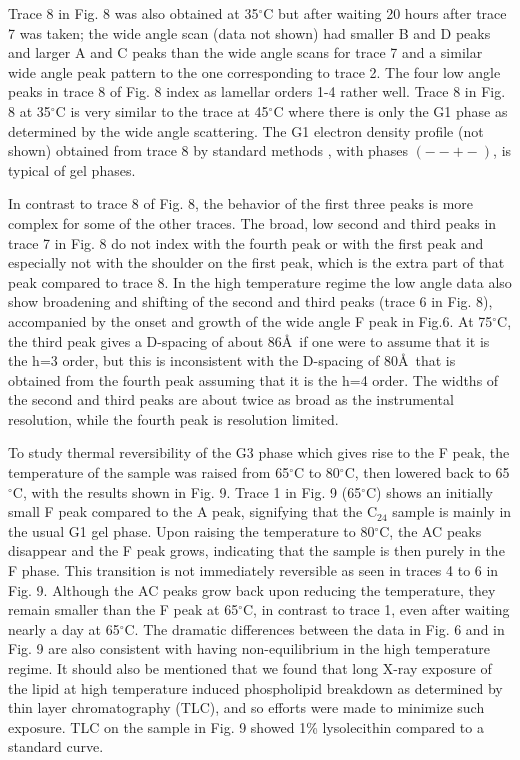 Trace 8 in Fig. 8 was also obtained at 35$^{\circ}$C but after waiting 20 hours 
after trace 7 was taken; the wide angle scan (data not shown) had smaller B 
and D peaks and larger A and C peaks than the wide angle scans for trace 7 and
a similar wide angle peak pattern to the one corresponding to trace 2.
The four low angle peaks in trace 8 of Fig. 8 index as lamellar orders 1-4 
rather well.  Trace 8 in Fig. 8 at 35$^{\circ}$C is very similar to the trace 
at 45$^{\circ}$C 
where there is only the G1 phase as determined by the wide angle scattering.
The G1 electron density profile (not shown) obtained from trace 8 by standard 
methods \cite{McI89}, with phases $(--+-)$, is typical of gel phases.

In contrast to trace 8 of Fig. 8, the behavior of the first three peaks
is more complex for some of the other traces.
The broad, low second and third peaks in trace 7 in Fig. 8 
do not index with the fourth peak or with the first peak and especially
not with the shoulder on the first peak, which is the extra part of that
peak compared to trace 8.  In the high temperature regime the low angle data 
also show broadening and shifting of the second and third peaks
(trace 6 in Fig. 8), accompanied by the onset and growth of the wide angle F 
peak in
Fig.6.  At 75$^{\circ}$C, the third peak gives a D-spacing of about 86\AA\ 
if one were to assume that it is the h=3 order, but this is inconsistent with
the D-spacing of 80\AA\ that is obtained from the fourth peak assuming that it 
is the h=4 order.  The widths of the second and third peaks are about twice as
broad as the instrumental resolution, while the fourth peak is resolution 
limited. 

To study thermal reversibility of the G3 phase which gives
rise to the F peak, the temperature of the sample was raised from 
65$^{\circ}$C to 80$^{\circ}$C, then lowered back to 65$^{\circ}$C, with 
the results shown in Fig. 9.   Trace 1 in Fig. 9 (65$^{\circ}$C) shows an 
initially
small F peak compared to the A peak, signifying that the C$_{24}$ sample is 
mainly in the usual G1 gel phase. Upon raising the temperature to 80$^{\circ}$C,
the AC peaks disappear and the F peak grows, indicating that the sample is 
then purely in the F phase. This transition is not immediately reversible as 
seen in traces 4 to 6 in Fig. 9.  Although the AC peaks grow back upon 
reducing the temperature, they remain smaller than the F peak at 65$^{\circ}$C,
in contrast to trace 1, even after waiting nearly a day at 65$^{\circ}$C.
The dramatic differences between the data in Fig. 6 and in Fig. 9 are also
consistent with having non-equilibrium in the high temperature regime.
It should also be mentioned that we found that long X-ray exposure of the
lipid at high temperature induced phospholipid breakdown as determined by 
thin layer chromatography (TLC), and so efforts were made to minimize such 
exposure.  TLC on the sample in Fig. 9 showed 1\% lysolecithin compared to a 
standard curve.

